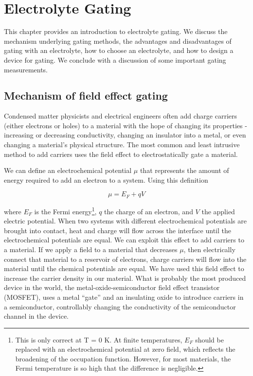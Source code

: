 \chapter{Electrolyte Gating}

This chapter provides an introduction to electrolyte gating. We discuss the mechanism underlying gating methods, the advantages and disadvantages of gating with an electrolyte, how to choose an electrolyte, and how to design a device for gating. We conclude with a discussion of some important gating measurements.

\section{Mechanism of field effect gating}

Condensed matter physicists and electrical engineers often add charge carriers (either electrons or holes) to a material with the hope of changing its properties - increasing or decreasing conductivity, changing an insulator into a metal, or even changing a material's physical structure. The most common and least intrusive method to add carriers uses the field effect to electrostatically gate a material.

We can define an electrochemical potential $\mu$ that represents the amount of energy required to add an electron to a system. Using this definition

\begin{equation}
\mu = E_{F} + qV
\end{equation}

where $E_{F}$ is the Fermi energy\footnote{This is only correct at T = 0 K. At finite temperatures, $E_{F}$ should be replaced with an electrochemical potential at zero field, which reflects the broadening of the occupation function. However, for most materials, the Fermi temperature is so high that the difference is negligible.}, $q$ the charge of an electron, and $V$ the applied electric potential. When two systems with different electrochemical potentials are brought into contact, heat and charge will flow across the interface until the electrochemical potentials are equal. We can exploit this effect to add carriers to a material. If we apply a field to a material that decreases $\mu$, then electrically connect that material to a reservoir of electrons, charge carriers will flow into the material until the chemical potentials are equal. We have used this field effect to increase the carrier density in our material. What is probably the most produced device in the world, the metal-oxide-semiconductor field effect transistor (MOSFET), uses a metal ``gate'' and an insulating oxide to introduce carriers in a semiconductor, controllably changing the conductivity of the semiconductor channel in the device.

